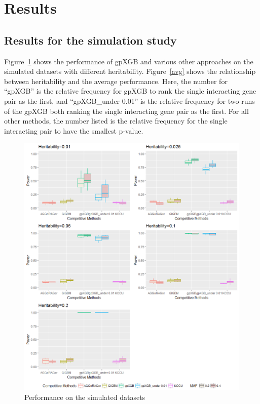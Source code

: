 \documentclass[11pt]{article}
\theoremstyle{plain}
\theoremstyle{definition}
\theoremstyle{remark}
\begin{document}
\section{Results}

\subsection{Results for the simulation study}

Figure~\ref{det} shows the performance of gpXGB and various other approaches on the simulated datasets with different heritability. Figure~\ref{avg} shows the relationship between heritability and the average performance. Here, the number for ``gpXGB'' is the relative frequency for gpXGB to rank the single interacting gene pair as the first, and ``gpXGB\_under 0.01'' is the relative frequency for two runs of the gpXGB both ranking the single interacting gene pair as the first. For all other methods, the number listed is the relative frequency for the single interacting pair to have the smallest p-value.

\begin{figure}[H]
    \begin{center}
       \includegraphics[scale=0.6]{Rplot02.png}
    \end{center}
\caption{\label{det}Performance on the simulated datasets}
\end{figure}
\end{document}
